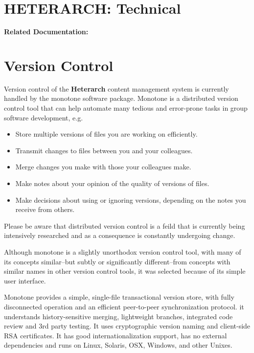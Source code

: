 \documentclass[12pt]{article}
\begin{document}
\section*{HETERARCH: Technical}

{\bf Related Documentation:}

\section*{Version Control}

Version control of the {\bf\small{Heterarch}} content management system is currently handled by the monotone software package. Monotone is a distributed version control tool that can help automate many tedious and error-prone tasks in group software development, e.g.
\begin{itemize}[noitemsep,nolistsep]
\item Store multiple versions of files you are working on efficiently.
\item Transmit changes to files between you and your colleagues.
\item Merge changes you make with those your colleagues make.
\item Make notes about your opinion of the quality of versions of files.
\item Make decisions about using or ignoring versions, depending on the notes you receive from others. 
\end{itemize}
Please be aware that distributed version control is a feild that is currently being intensively researched and as a consequence is constantly undergoing change.

Although monotone is a slightly unorthodox version control tool, with many of its concepts similar--but subtly or significantly different--from concepts with similar names in other version control tools, it was selected because of its simple user interface.

Monotone provides a simple, single-file transactional version store, with fully disconnected operation and an efficient peer-to-peer synchronization protocol. it understands history-sensitive merging, lightweight branches, integrated code review and 3rd party testing. It uses cryptographic version naming and client-side RSA certificates. It has good internationalization support, has no external dependencies and runs on Linux, Solaris, OSX, Windows, and other Unixes.
\end{document}
